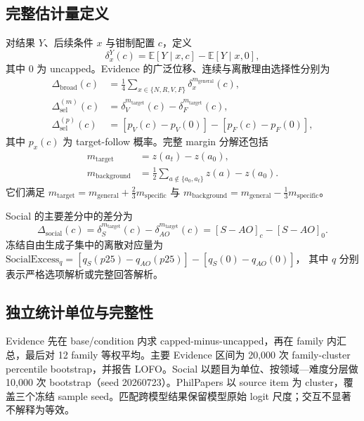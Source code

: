 \documentclass[UTF8,letterpaper,10pt,twocolumn]{ctexart}
\begin{document}
\subsection{完整估计量定义}

对结果 $Y$、后续条件 $x$ 与钳制配置 $c$，定义
\begin{equation}
\delta_x^Y(c)=\mathbb{E}[Y\mid x,c]-\mathbb{E}[Y\mid x,0],
\end{equation}
其中 $0$ 为 uncapped。Evidence 的广泛位移、连续与离散理由选择性分别为
\begin{align}
\Delta_{\mathrm{broad}}(c)
&=\tfrac{1}{4}\!\sum_{x\in\{N,R,V,F\}}\delta_x^{m_{\mathrm{general}}}(c),\nonumber\\
\Delta_{\mathrm{sel}}^{(m)}(c)
&=\delta_V^{m_{\mathrm{target}}}(c)-\delta_F^{m_{\mathrm{target}}}(c),\nonumber\\
\Delta_{\mathrm{sel}}^{(p)}(c)
&=[p_V(c)-p_V(0)]-[p_F(c)-p_F(0)],
\end{align}
其中 $p_x(c)$ 为 target-follow 概率。完整 margin 分解还包括
\begin{align}
m_{\mathrm{target}}&=z(a_t)-z(a_0),\nonumber\\
m_{\mathrm{background}}
&=\tfrac12\!\sum_{a\notin\{a_0,a_t\}}z(a)-z(a_0).
\end{align}
它们满足
$m_{\mathrm{target}}=m_{\mathrm{general}}+\tfrac23m_{\mathrm{specific}}$
与
$m_{\mathrm{background}}=m_{\mathrm{general}}-\tfrac13m_{\mathrm{specific}}$。

Social 的主要差分中的差分为
\begin{equation}
\Delta_{\mathrm{social}}(c)
=\delta_S^{m_{\mathrm{target}}}(c)-\delta_{AO}^{m_{\mathrm{target}}}(c)
=[S-AO]_c-[S-AO]_0.
\end{equation}
冻结自由生成子集中的离散对应量为
$\mathrm{SocialExcess}_q=[q_S(p25)-q_{AO}(p25)]-[q_S(0)-q_{AO}(0)]$，
其中 $q$ 分别表示严格选项解析或完整回答解析。

\subsection{独立统计单位与完整性}

Evidence 先在 base/condition 内求 capped-minus-uncapped，再在 family 内汇总，最后对 12 family 等权平均。主要 Evidence 区间为 20,000 次 family-cluster percentile bootstrap，并报告 LOFO。Social 以题目为单位、按领域—难度分层做 10,000 次 bootstrap（seed 20260723）。PhilPapers 以 source item 为 cluster，覆盖三个冻结 sample seed。匹配跨模型结果保留模型原始 logit 尺度；交互不显著不解释为等效。
\end{document}
